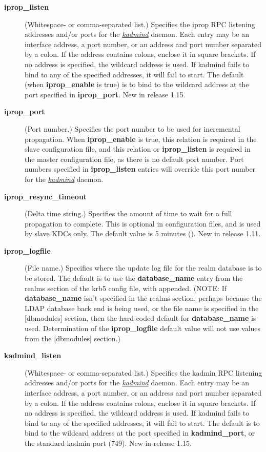 \documentclass[letterpaper,10pt,english]{sphinxmanual}
\begin{document}
\begin{description}
\item[{\textbf{iprop\_listen}}] \leavevmode
(Whitespace- or comma-separated list.)  Specifies the iprop RPC
listening addresses and/or ports for the {\hyperref[admin/admin_commands/kadmind:kadmind-8]{\emph{kadmind}}} daemon.
Each entry may be an interface address, a port number, or an
address and port number separated by a colon.  If the address
contains colons, enclose it in square brackets.  If no address is
specified, the wildcard address is used.  If kadmind fails to bind
to any of the specified addresses, it will fail to start.  The
default (when \textbf{iprop\_enable} is true) is to bind to the wildcard
address at the port specified in \textbf{iprop\_port}.  New in release
1.15.

\item[{\textbf{iprop\_port}}] \leavevmode
(Port number.)  Specifies the port number to be used for
incremental propagation.  When \textbf{iprop\_enable} is true, this
relation is required in the slave configuration file, and this
relation or \textbf{iprop\_listen} is required in the master
configuration file, as there is no default port number.  Port
numbers specified in \textbf{iprop\_listen} entries will override this
port number for the {\hyperref[admin/admin_commands/kadmind:kadmind-8]{\emph{kadmind}}} daemon.

\item[{\textbf{iprop\_resync\_timeout}}] \leavevmode
(Delta time string.)  Specifies the amount of time to wait for a
full propagation to complete.  This is optional in configuration
files, and is used by slave KDCs only.  The default value is 5
minutes ().  New in release 1.11.

\item[{\textbf{iprop\_logfile}}] \leavevmode
(File name.)  Specifies where the update log file for the realm
database is to be stored.  The default is to use the
\textbf{database\_name} entry from the realms section of the krb5 config
file, with  appended.  (NOTE: If \textbf{database\_name} isn't
specified in the realms section, perhaps because the LDAP database
back end is being used, or the file name is specified in the
{[}dbmodules{]} section, then the hard-coded default for
\textbf{database\_name} is used.  Determination of the \textbf{iprop\_logfile}
default value will not use values from the {[}dbmodules{]} section.)

\item[{\textbf{kadmind\_listen}}] \leavevmode
(Whitespace- or comma-separated list.)  Specifies the kadmin RPC
listening addresses and/or ports for the {\hyperref[admin/admin_commands/kadmind:kadmind-8]{\emph{kadmind}}} daemon.
Each entry may be an interface address, a port number, or an
address and port number separated by a colon.  If the address
contains colons, enclose it in square brackets.  If no address is
specified, the wildcard address is used.  If kadmind fails to bind
to any of the specified addresses, it will fail to start.  The
default is to bind to the wildcard address at the port specified
in \textbf{kadmind\_port}, or the standard kadmin port (749).  New in
release 1.15.


\end{description}
\end{document}
